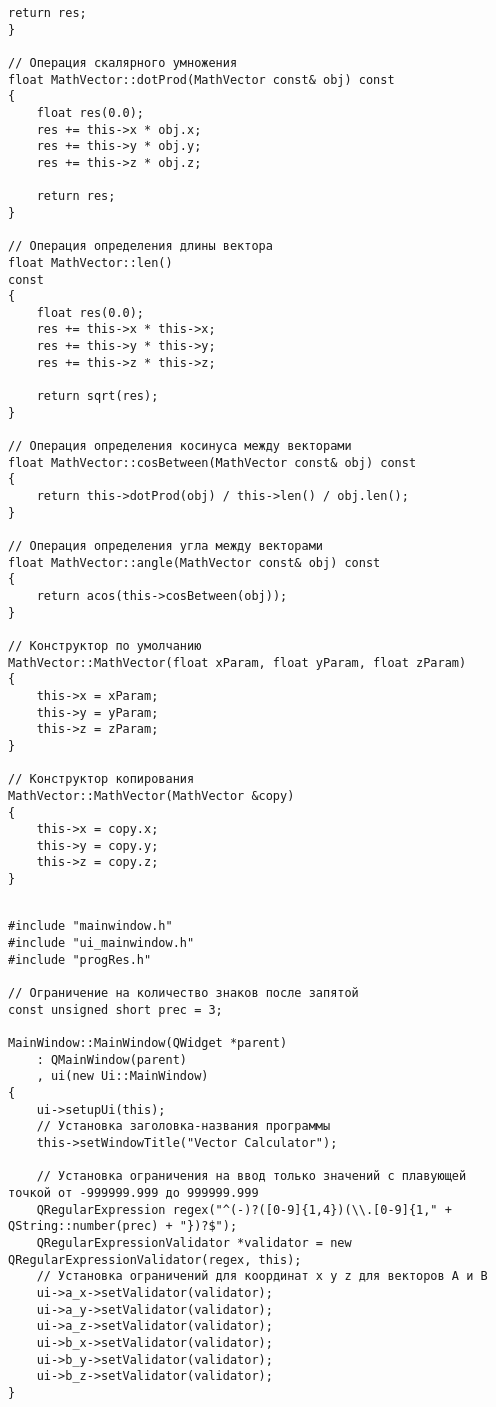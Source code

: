 \begin{landscape}
\begin{lstlisting}[caption={mathVector.cpp}]
    return res;
}

// Операция скалярного умножения
float MathVector::dotProd(MathVector const& obj) const
{
    float res(0.0);
    res += this->x * obj.x;
    res += this->y * obj.y;
    res += this->z * obj.z;

    return res;
}

// Операция определения длины вектора
float MathVector::len()
const
{
    float res(0.0);
    res += this->x * this->x;
    res += this->y * this->y;
    res += this->z * this->z;

    return sqrt(res);
}

// Операция определения косинуса между векторами
float MathVector::cosBetween(MathVector const& obj) const
{
    return this->dotProd(obj) / this->len() / obj.len();
}

// Операция определения угла между векторами
float MathVector::angle(MathVector const& obj) const
{
    return acos(this->cosBetween(obj));
}

// Конструктор по умолчанию
MathVector::MathVector(float xParam, float yParam, float zParam)
{
    this->x = xParam;
    this->y = yParam;
    this->z = zParam;
}

// Конструктор копирования
MathVector::MathVector(MathVector &copy)
{
    this->x = copy.x;
    this->y = copy.y;
    this->z = copy.z;
}

\end{lstlisting}

\newpage
\begin{lstlisting}[caption={mainwindow.cpp}]

#include "mainwindow.h"
#include "ui_mainwindow.h"
#include "progRes.h"

// Ограничение на количество знаков после запятой
const unsigned short prec = 3;

MainWindow::MainWindow(QWidget *parent)
    : QMainWindow(parent)
    , ui(new Ui::MainWindow)
{
    ui->setupUi(this);
    // Установка заголовка-названия программы
    this->setWindowTitle("Vector Calculator");

    // Установка ограничения на ввод только значений с плавующей точкой от -999999.999 до 999999.999
    QRegularExpression regex("^(-)?([0-9]{1,4})(\\.[0-9]{1," + QString::number(prec) + "})?$");
    QRegularExpressionValidator *validator = new QRegularExpressionValidator(regex, this);
    // Установка ограничений для координат x y z для векторов A и B
    ui->a_x->setValidator(validator);
    ui->a_y->setValidator(validator);
    ui->a_z->setValidator(validator);
    ui->b_x->setValidator(validator);
    ui->b_y->setValidator(validator);
    ui->b_z->setValidator(validator);
}


\end{lstlisting}
\end{landscape}
